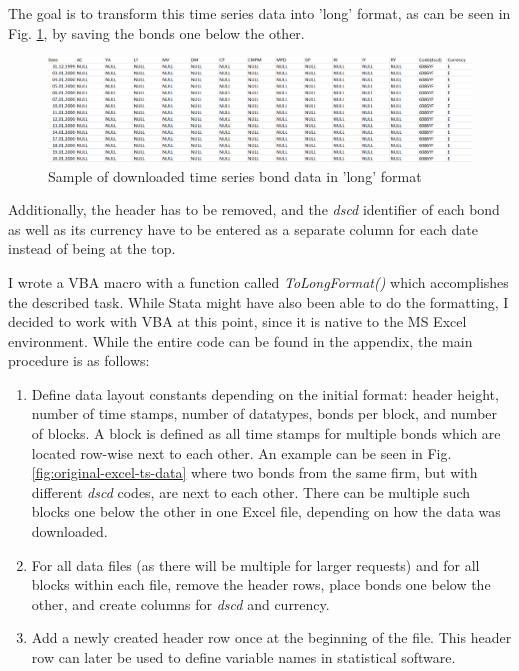 The goal is to transform this time series data into 'long' format, as can be seen in Fig. \ref{fig:long-format-excel-ts-data}, by saving the bonds one below the other. 
\begin{figure}[h]
	\centering
	\includegraphics[width=1.0\linewidth]{figures/long-format-excel-ts-data}
	\caption{Sample of downloaded time series bond data in 'long' format}
	\label{fig:long-format-excel-ts-data}
\end{figure}
Additionally, the header has to be removed, and the \textit{dscd} identifier of each bond as well as its currency have to be entered as a separate column for each date instead of being at the top. 

I wrote a VBA macro with a function called \textit{ToLongFormat()} which accomplishes the described task. While Stata might have also been able to do the formatting, I decided to work with VBA at this point, since it is native to the MS Excel environment. While the entire code can be found in the appendix, %
the main procedure is as follows: 
\begin{enumerate}
	\item Define data layout constants depending on the initial format: header height, number of time stamps, number of datatypes, bonds per block, and number of blocks. A block is defined as all time stamps for multiple bonds which are located row-wise next to each other. An example can be seen in Fig. \ref{fig:original-excel-ts-data} where two bonds from the same firm, but with different \textit{dscd} codes, are next to each other. There can be multiple such blocks one below the other in one Excel file, depending on how the data was downloaded. 
	\item For all data files (as there will be multiple for larger requests) and for all blocks within each file, remove the header rows, place bonds one below the other, and create columns for \textit{dscd} and currency. 
	\item Add a newly created header row once at the beginning of the file. This header row can later be used to define variable names in statistical software. 
\end{enumerate}

